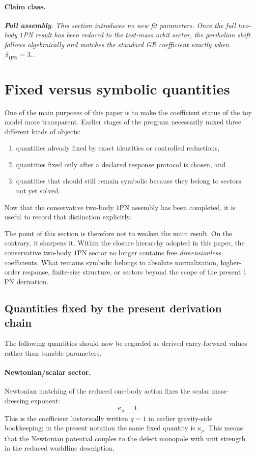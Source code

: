 \documentclass[11pt]{article}
\newcommand{\krho}{\kappa_{\rho}}
\newcommand{\betaPN}{\beta_{\mathrm{1PN}}}
\newcommand{\FullMatch}{\textbf{Full assembly}}
\newcommand{\claimclass}[1]{\paragraph{Claim class.}\emph{#1.}}
\begin{document}
\claimclass{\FullMatch. This section introduces no new fit parameters. Once the full
two-body \(1\)PN result has been reduced to the test-mass orbit sector, the perihelion
shift follows algebraically and matches the standard GR coefficient exactly when
\(\betaPN=3\).}

\section{Fixed versus symbolic quantities}
\label{sec:ledger-fixed-vs-symbolic}

One of the main purposes of this paper is to make the coefficient status of the toy model
more transparent. Earlier stages of the program necessarily mixed three different kinds of
objects:
\begin{enumerate}[leftmargin=1.5em]
  \item quantities already fixed by exact identities or controlled reductions,
  \item quantities fixed only after a declared response protocol is chosen, and
  \item quantities that should still remain symbolic because they belong to sectors not
  yet solved.
\end{enumerate}
Now that the conservative two-body \(1\)PN assembly has been completed, it is useful to
record that distinction explicitly.

The point of this section is therefore not to weaken the main result. On the contrary, it
sharpens it. Within the closure hierarchy adopted in this paper, the conservative two-body
\(1\)PN sector no longer contains free \emph{dimensionless} coefficients. What remains
symbolic belongs to absolute normalization, higher-order response, finite-size structure,
or sectors beyond the scope of the present \(1\)PN derivation.

\subsection{Quantities fixed by the present derivation chain}
\label{sec:fixed-quantities}

The following quantities should now be regarded as derived carry-forward values rather than
tunable parameters.

\paragraph{Newtonian/scalar sector.}
Newtonian matching of the reduced one-body action fixes the scalar mass-dressing exponent:
\begin{equation}
\krho=1.
\label{eq:fixed-kappa-rho}
\end{equation}
This is the coefficient historically written \(q=1\) in earlier gravity-side bookkeeping;
in the present notation the same fixed quantity is \(\krho\).
This means that the Newtonian potential couples to the defect monopole with unit strength
in the reduced worldline description.
\end{document}
